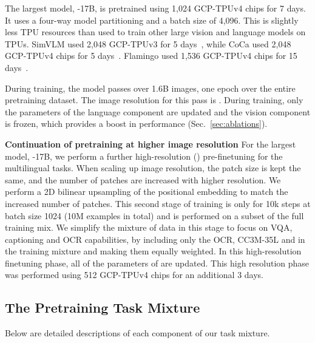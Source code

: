 The largest model, \NAME-17B, is pretrained using 1,024 GCP-TPUv4 chips for 7 days.
It uses a four-way model partitioning \citep{t5x} and a batch size of 4,096.
This is slightly less TPU resources than used to train other large vision and language models on TPUs.
SimVLM used 2,048 GCP-TPUv3 for 5 days~\citep{simvlm}, while CoCa used 2,048 GCP-TPUv4 chips for 5 days~\citep{coca}.
Flamingo used 1,536 GCP-TPUv4 chips for 15 days~\citep{flamingo}.

During training, the model passes over 1.6B images, one epoch over the entire pretraining dataset. 
The image resolution for this pass is .
During training, only the parameters of the language component are updated and the vision component is frozen, which provides a boost in performance (Sec.~\ref{sec:ablations}). 

\textbf{Continuation of pretraining at higher image resolution} For the largest model, \NAME-17B, we perform a further high-resolution () pre-finetuning for the multilingual tasks. When scaling up image resolution, the patch size is kept the same, and the number of patches are increased with higher resolution. We perform a 2D bilinear upsampling of the positional embedding to match the increased number of patches.
This second stage of training is only for 10k steps at batch size 1024 (10M examples in total) and is performed on a subset of the full training mix.
We simplify the mixture of data in this stage to focus on VQA, captioning and OCR capabilities, by including only the OCR, CC3M-35L and \qsq in the training mixture and making them equally weighted. 
In this high-resolution finetuning phase, all of the parameters of \NAME are updated. This high resolution phase was performed using 512 GCP-TPUv4 chips for an additional 3 days.


\subsection{The Pretraining Task Mixture}
\label{sec:mixture}
Below are detailed descriptions of each component of our task mixture.


